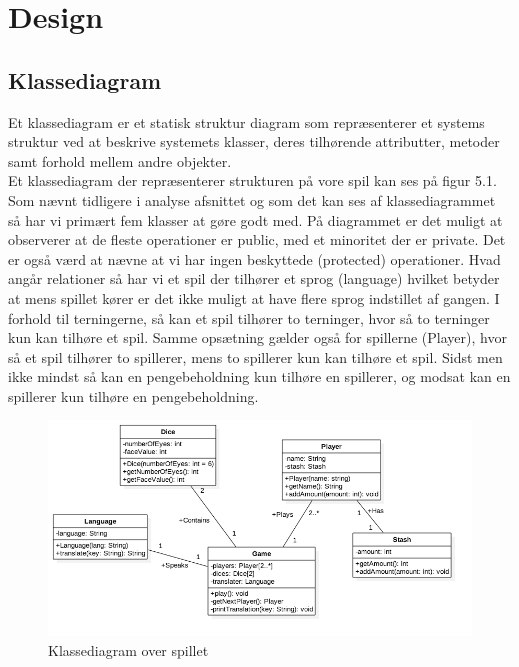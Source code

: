 \chapter{Design}



\section{Klassediagram}

\noindent Et klassediagram er et statisk struktur diagram som repræsenterer et systems struktur ved at beskrive systemets klasser, deres tilhørende attributter, metoder samt forhold mellem andre objekter.\\

\noindent Et klassediagram der repræsenterer strukturen på vore spil kan ses på figur 5.1. Som nævnt tidligere i analyse afsnittet og som det kan ses af klassediagrammet så har vi primært fem klasser at gøre godt med. På diagrammet er det muligt at observerer at de fleste operationer er public, med et minoritet der er private. Det er også værd at nævne at vi har ingen beskyttede (protected) operationer. Hvad angår relationer så har vi et spil der tilhører et sprog (language) hvilket betyder at mens spillet kører er det ikke muligt at have flere sprog indstillet af gangen. I forhold til terningerne, så kan et spil tilhører to terninger, hvor så to terninger kun kan tilhøre et spil. Samme opsætning gælder også for spillerne (Player), hvor så et spil tilhører to spillerer, mens to spillerer kun kan tilhøre et spil. Sidst men ikke mindst så kan en pengebeholdning kun tilhøre en spillerer, og modsat kan en spillerer kun tilhøre en pengebeholdning.\\

\begin{figure}[H]
    \begin{center}
        \includegraphics[width=15cm]{graphics/Class_Diagram.png}
        \caption{Klassediagram over spillet}
        \label{fig:class_diagram}
    \end{center}
\end{figure}


